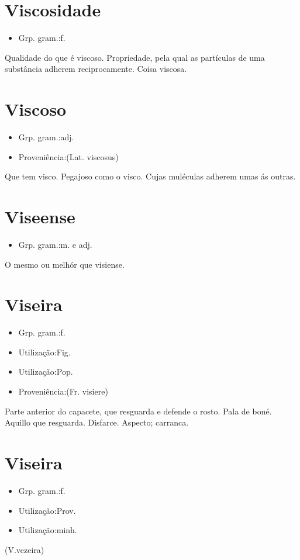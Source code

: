 \documentclass{article}
\begin{document}
\section{Viscosidade}
\begin{itemize}
\item {Grp. gram.:f.}
\end{itemize}
Qualidade do que é viscoso.
Propriedade, pela qual as partículas de uma substância adherem reciprocamente.
Coisa viscosa.
\section{Viscoso}
\begin{itemize}
\item {Grp. gram.:adj.}
\end{itemize}
\begin{itemize}
\item {Proveniência:(Lat. \textunderscore viscosus\textunderscore )}
\end{itemize}
Que tem visco.
Pegajoso como o visco.
Cujas muléculas adherem umas ás outras.
\section{Viseense}
\begin{itemize}
\item {Grp. gram.:m.  e  adj.}
\end{itemize}
O mesmo ou melhór que \textunderscore visiense\textunderscore .
\section{Viseira}
\begin{itemize}
\item {Grp. gram.:f.}
\end{itemize}
\begin{itemize}
\item {Utilização:Fig.}
\end{itemize}
\begin{itemize}
\item {Utilização:Pop.}
\end{itemize}
\begin{itemize}
\item {Proveniência:(Fr. \textunderscore visiere\textunderscore )}
\end{itemize}
Parte anterior do capacete, que resguarda e defende o rosto.
Pala de boné.
Aquillo que resguarda.
Disfarce.
Aspecto; carranca.
\section{Viseira}
\begin{itemize}
\item {Grp. gram.:f.}
\end{itemize}
\begin{itemize}
\item {Utilização:Prov.}
\end{itemize}
\begin{itemize}
\item {Utilização:minh.}
\end{itemize}
(V.vezeira)
\end{document}
